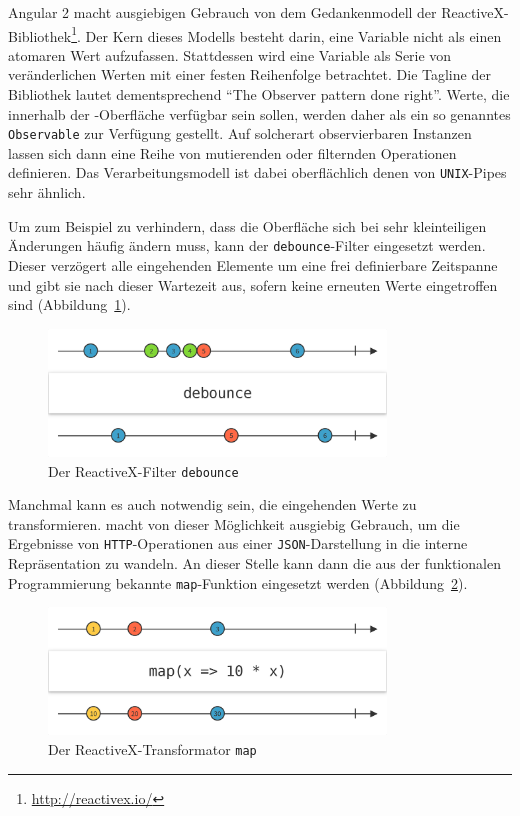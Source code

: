 Angular 2 macht ausgiebigen Gebrauch von dem Gedankenmodell der ReactiveX-Bibliothek\footnote{\url{http://reactivex.io/}}. Der Kern dieses Modells besteht darin, eine Variable nicht als einen atomaren Wert aufzufassen. Stattdessen wird eine Variable als Serie von veränderlichen Werten mit einer festen Reihenfolge betrachtet. Die Tagline der Bibliothek lautet dementsprechend "`The Observer pattern done right"'. Werte, die innerhalb der \idename{}-Oberfläche verfügbar sein sollen, werden daher als ein so genanntes \texttt{Observable} zur Verfügung gestellt. Auf solcherart observierbaren Instanzen lassen sich dann eine Reihe von mutierenden oder filternden Operationen definieren. Das Verarbeitungsmodell ist dabei oberflächlich denen von \texttt{UNIX}-Pipes sehr ähnlich.

Um zum Beispiel zu verhindern, dass die Oberfläche sich bei sehr kleinteiligen Änderungen häufig ändern muss, kann der \texttt{debounce}-Filter eingesetzt werden. Dieser verzögert alle eingehenden Elemente um eine frei definierbare Zeitspanne und gibt sie nach dieser Wartezeit aus, sofern keine erneuten Werte eingetroffen sind (Abbildung~\ref{fig:reactivex-debounce}). 

\begin{figure}[h]
  \centering \includegraphics[width=0.8\textwidth]{images/reactivex-debounce}
  \caption{Der ReactiveX-Filter \texttt{debounce}}
  \label{fig:reactivex-debounce}
\end{figure}

Manchmal kann es auch notwendig sein, die eingehenden Werte zu transformieren. \idename{} macht von dieser Möglichkeit ausgiebig Gebrauch, um die Ergebnisse von \texttt{HTTP}-Operationen aus einer \texttt{JSON}-Darstellung in die interne Repräsentation zu wandeln. An dieser Stelle kann dann die aus der funktionalen Programmierung bekannte \texttt{map}-Funktion eingesetzt werden (Abbildung~\ref{fig:reactivex-map}).

\begin{figure}[h]
  \centering \includegraphics[width=0.8\textwidth]{images/reactivex-map}
  \caption{Der ReactiveX-Transformator \texttt{map}}
  \label{fig:reactivex-map}
\end{figure}


